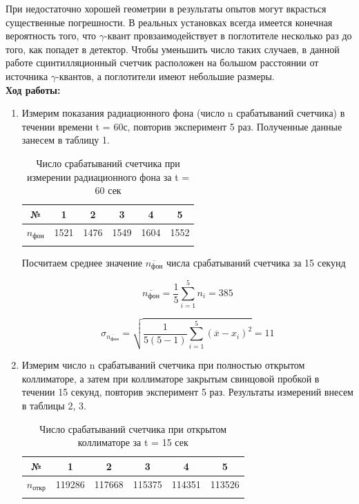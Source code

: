 \documentclass[a4paper, 12pt]{article}%
\begin{document}
	При недостаточно хорошей геометрии в результаты опытов могут
	вкрасться существенные погрешности. В реальных установках всегда имеется конечная вероятность того, что $\gamma$-квант провзаимодействует в
	поглотителе несколько раз до того, как попадет в детектор. Чтобы уменьшить число таких случаев, в данной работе сцинтилляционный счетчик расположен на большом расстоянии от источника $\gamma$-квантов, а поглотители имеют небольшие
	размеры.\\
	
	\textbf{Ход работы: }\\
	
	\begin{enumerate}
		
	\item Измерим показания радиационного фона (число n срабатываний счетчика) в течении времени t = 60с, повторив эксперимент 5 раз. Полученные данные занесем в таблицу 1.
			
	\begin{longtable}{|c|c|c|c|c|c|}
		\hline
		№ & 1 & 2 & 3 & 4 & 5\\ \hline
		$n_{\text{фон}}$ & 1521 & 1476 & 1549 & 1604 & 1552 \\ \hline
		\caption{Число срабатываний счетчика при измерении радиационного фона за t = 60 сек}
	\end{longtable}

	Посчитаем среднее значение $\overline{n_{\text{фон}}}$ числа срабатываний счетчика за 15 секунд
	
	$$\overline{n_{\text{фон}}} = \frac{1}{5} \sum_{i = 1}^{5} n_i = 385$$
	
	$$ \sigma_{\overline{n_{\text{фон}}}} = \sqrt{\frac{1}{5(5-1)} \sum_{i = 1}^{5} (\overline{x} - x_i)^2} = 11 $$
	
	\item Измерим число n срабатываний счетчика при полностью открытом коллиматоре, а затем при коллиматоре закрытым свинцовой пробкой в течении 15 секунд, повторив эксперимент 5 раз. Результаты измерений внесем в таблицы 2, 3.
	
	\begin{longtable}{|c|c|c|c|c|c|}
		\hline
		№ & 1 & 2 & 3 & 4 & 5\\ \hline
		$n_{\text{откр}}$ & 119286 & 117668 & 115375 & 114351 & 113526 \\ \hline
		\caption{Число срабатываний счетчика при открытом коллиматоре за t = 15 сек}
	\end{longtable}


\end{enumerate}
\end{document}
